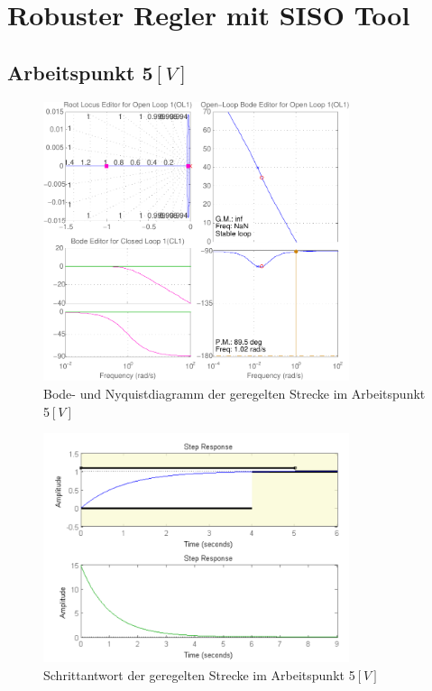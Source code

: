 \section{Robuster Regler mit SISO Tool}

\subsection{Arbeitspunkt 5$\si{[V]}$}
\begin{figure}[h!]
    \centering
    \includegraphics[width=0.8\textwidth]{10/siso_diagramms_g5.pdf}
    \caption{Bode- und Nyquistdiagramm der geregelten Strecke im Arbeitspunkt 5$\si{[V]}$}
    \label{fig:10_diag_5}
\end{figure}
\begin{figure}[h!]
    \centering
    \includegraphics[width=0.8\textwidth]{10/siso_step_g5.pdf}
    \caption{Schrittantwort der geregelten Strecke im Arbeitspunkt 5$\si{[V]}$}
    \label{fig:10_step_5}
\end{figure}
